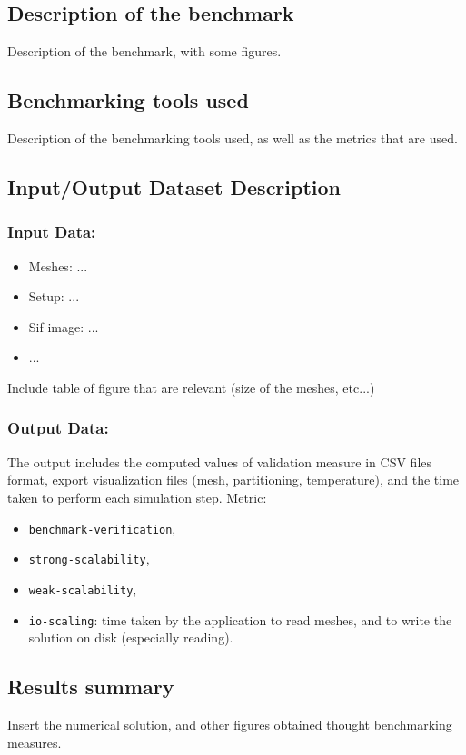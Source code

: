 

\subsection{Description of the benchmark}

Description of the benchmark, with some figures.




\subsection{Benchmarking tools used}

Description of the benchmarking tools used, as well as the metrics that are used.




\subsection{Input/Output Dataset Description}


\subsubsection{Input Data:}
  \begin{itemize}
  \item Meshes: ...
  \item Setup: ...
  \item Sif image: ...
  \item ...
  \end{itemize}

Include table of figure that are relevant (size of the meshes, etc...)

\subsubsection{Output Data:}

The output includes the computed values of validation measure in CSV files format, export visualization files (mesh, partitioning, temperature), and the time taken to perform each simulation step.
Metric:
\begin{itemize}
    \item \texttt{benchmark-verification},
    \item \texttt{strong-scalability},
    \item \texttt{weak-scalability},
    \item \texttt{io-scaling}: time taken by the application to read meshes, and to write the solution on disk (especially reading).
\end{itemize}





\subsection{Results summary}


Insert the numerical solution, and other figures obtained thought benchmarking measures.
